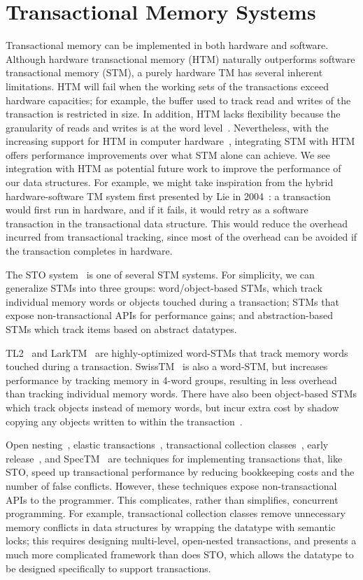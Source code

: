 \section{Transactional Memory Systems}
Transactional memory can be implemented in both hardware and software. Although hardware transactional memory (HTM) naturally outperforms software transactional memory (STM), a purely hardware TM has several inherent limitations. HTM will fail when the working sets of the transactions exceed hardware capacities; for example, the buffer used to track read and writes of the transaction is restricted in size. In addition, HTM lacks flexibility because the granularity of reads and writes is at the word level~\cite{htm}. Nevertheless, with the increasing support for HTM in computer hardware~\cite{intel_htm}, integrating STM with HTM offers performance improvements over what STM alone can achieve. We see integration with HTM as potential future work to improve the performance of our data structures. For example, we might take inspiration from the hybrid hardware-software TM system first presented by Lie in 2004~\cite{lie}: a transaction would first run in hardware, and if it fails, it would retry as a software transaction in the transactional data structure. This would reduce the overhead incurred from transactional tracking, since most of the overhead can be avoided if the transaction completes in hardware.

The STO system~\cite{sto} is one of several STM systems. For simplicity, we can generalize STMs into three groups: word/object-based STMs, which track individual memory words or objects touched during a transaction; STMs that expose non-transactional APIs for performance gains; and abstraction-based STMs which track items based on abstract datatypes.

TL2~\cite{tl2} and LarkTM~\cite{larktm} are highly-optimized word-STMs that track memory words touched during a transaction. SwissTM~\cite{swisstm} is also a word-STM, but increases performance by tracking memory in 4-word groups, resulting in less overhead than tracking individual memory words. There have also been object-based STMs which track objects instead of memory words, but incur extra cost by shadow copying any objects written to within the transaction~\cite{stm_objects}. 

Open nesting~\cite{opennesting}, elastic transactions~\cite{elastic}, transactional collection classes~\cite{tcc}, early release~\cite{earlyrelease}, and SpecTM~\cite{spectm} are techniques for implementing transactions that, like STO, speed up transactional performance by reducing bookkeeping costs and the number of false conflicts. However, these techniques expose non-transactional APIs to the programmer. This complicates, rather than simplifies, concurrent programming. For example, transactional collection classes remove unnecessary memory conflicts in data structures by wrapping the datatype with semantic locks; this requires designing multi-level, open-nested transactions, and presents a much more complicated framework than does STO, which allows the datatype to be designed specifically to support transactions.

